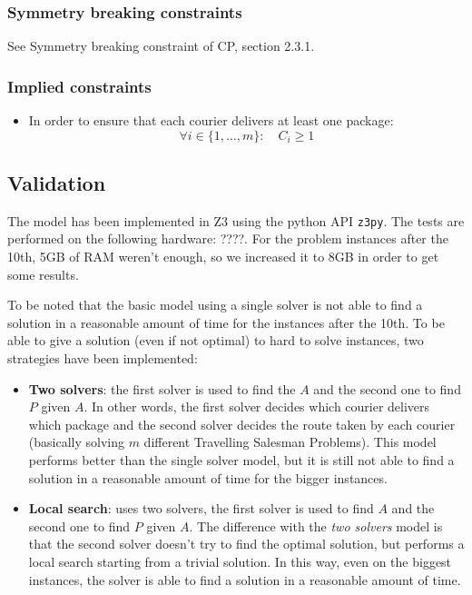 \subsubsection{Symmetry breaking constraints}
See Symmetry breaking constraint of CP, section 2.3.1. 

\subsubsection{Implied constraints}

\begin{itemize}
    \item In order to ensure that each courier delivers at least one package:
    \begin{equation}
        \forall i \in \{1, \dots, m\}: \quad C_i \geq 1  
    \end{equation}
\end{itemize}


\subsection{Validation}

The model has been implemented in Z3 using the python API \texttt{z3py}. The tests are performed on the following hardware: ????. For the problem instances after the 10th, 5GB of RAM weren't enough, so we increased it to 8GB in order to get some results.

To be noted that the basic model using a single solver is not able to find a solution in a reasonable amount of time for the instances after the 10th. To be able to give a solution (even if not optimal) to hard to solve instances, two strategies have been implemented:

\begin{itemize}
    \item \textbf{Two solvers}: the first solver is used to find the $A$ and the second one to find $P$ given $A$. In other words, the first solver decides which courier delivers which package and the second solver decides the route taken by each courier (basically solving $m$ different Travelling Salesman Problems). This model performs better than the single solver model, but it is still not able to find a solution in a reasonable amount of time for the bigger instances.

    \item \textbf{Local search}: uses two solvers, the first solver is used to find $A$ and the second one to find $P$ given $A$. The difference with the \textit{two solvers} model is that the second solver doesn't try to find the optimal solution, but performs a local search starting from a trivial solution. In this way, even on the biggest instances, the solver is able to find a solution in a reasonable amount of time.

\end{itemize}




